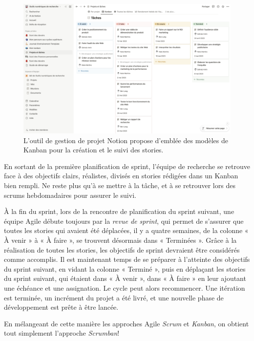 \documentclass[
  letterpaper,
  DIV=11,
  numbers=noendperiod]{scrreprt}
\begin{document}
\begin{figure}

{\centering \includegraphics[width=5.01in,height=\textheight]{images/chapitre8_kanban_notion.png}

}

\caption{\label{fig-kanban}L'outil de gestion de projet Notion propose
d'emblée des modèles de Kanban pour la création et le suivi des
stories.}

\end{figure}

En sortant de la première planification de sprint, l'équipe de recherche
se retrouve face à des objectifs clairs, réalistes, divisés en stories
rédigées dans un Kanban bien rempli. Ne reste plus qu'à se mettre à la
tâche, et à se retrouver lors des scrums hebdomadaires pour assurer le
suivi.

À la fin du sprint, lors de la rencontre de planification du sprint
suivant, une équipe Agile débute toujours par la \emph{revue de sprint},
qui permet de s'assurer que toutes les stories qui avaient été
déplacées, il y a quatre semaines, de la colonne « À venir » à « À faire
», se trouvent désormais dans « Terminées ». Grâce à la réalisation de
toutes les stories, les objectifs de sprint devraient être considérés
comme accomplis. Il est maintenant temps de se préparer à l'atteinte des
objectifs du sprint suivant, en vidant la colonne « Terminé », puis en
déplaçant les stories du sprint suivant, qui étaient dans « À venir »,
dans « À faire » en leur ajoutant une échéance et une assignation. Le
cycle peut alors recommencer. Une itération est terminée, un incrément
du projet a été livré, et une nouvelle phase de développement est prête
à être lancée.

En mélangeant de cette manière les approches Agile \emph{Scrum} et
\emph{Kanban}, on obtient tout simplement l'approche \emph{Scrumban}!
\end{document}

